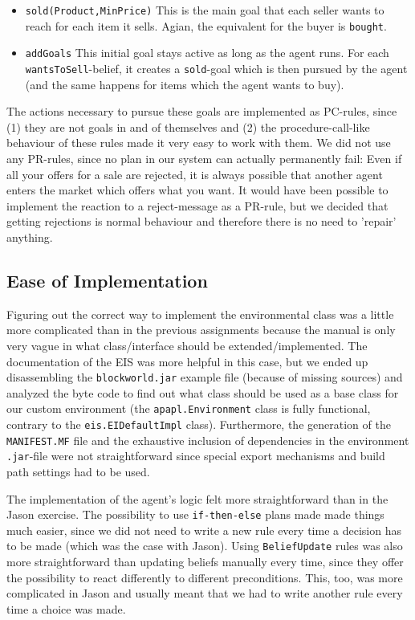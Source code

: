 \documentclass[a4paper,11pt]{article}
\begin{document}
\begin{itemize}
  \item \texttt{sold(Product,MinPrice)} This is the main goal that each seller wants to reach for each item it sells. Agian, the equivalent for the buyer is \texttt{bought}.
  \item \texttt{addGoals} This initial goal stays active as long as the agent runs. For each \texttt{wantsToSell}-belief, it creates a \texttt{sold}-goal which is then pursued by the agent (and the same happens for items which the agent wants to buy).
\end{itemize}

\noindent The actions necessary to pursue these goals are implemented as PC-rules, since (1) they are not goals in and of themselves and (2) the procedure-call-like behaviour of these rules made it very easy to work with them. We did not use any PR-rules, since no plan in our system can actually permanently fail: Even if all your offers for a sale are rejected, it is always possible that another agent enters the market which offers what you want. It would have been possible to implement the reaction to a reject-message as a PR-rule, but we decided that getting rejections is normal behaviour and therefore there is no need to 'repair' anything.


\subsection{Ease of Implementation}
Figuring out the correct way to implement the environmental class was a little more complicated than in the previous assignments because the manual is only very vague in what class/interface should be extended/implemented. The documentation of the EIS was more helpful in this case, but we ended up disassembling the \texttt{blockworld.jar} example file (because of missing sources) and analyzed the byte code to find out what class should be used as a base class for our custom environment (the \texttt{apapl.Environment} class is fully functional, contrary to the \texttt{eis.EIDefaultImpl} class). Furthermore, the generation of the \texttt{MANIFEST.MF} file and the exhaustive inclusion of dependencies in the environment \texttt{.jar}-file were not straightforward since special export mechanisms and build path settings had to be used. 

The implementation of the agent's logic felt more straightforward than in the Jason exercise. The possibility to use \texttt{if-then-else} plans made made things much easier, since we did not need to write a new rule every time a decision has to be made (which was the case with Jason). Using \texttt{BeliefUpdate} rules was also more straightforward than updating beliefs manually every time, since they offer the possibility to react differently to different preconditions. This, too, was more complicated in Jason and usually meant that we had to write another rule every time a choice was made.
\end{document}
